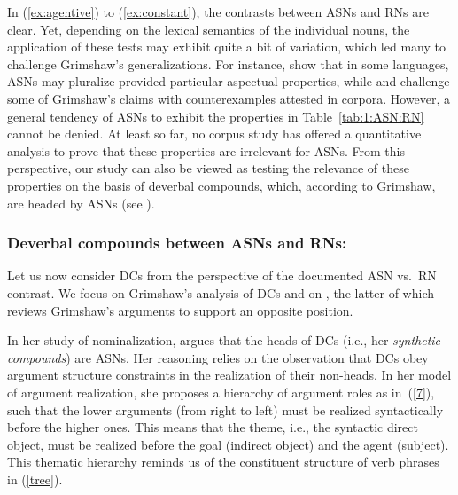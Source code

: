 \documentclass[output=paper]{langsci/langscibook}
\begin{document}
\begin{exe}
\end{exe}

 {In (\ref{ex:agentive}) to (\ref{ex:constant}), the contrasts between ASNs and RNs are clear. Yet, depending on the lexical semantics of the individual nouns, the application of these tests may exhibit quite a bit of variation, which led many to challenge Grimshaw's generalizations. For instance, \cite{alexiadou:iordachioaia:soare:10} show that in some languages, ASNs may pluralize provided particular aspectual properties, while  \cite{grimm:mcnally:13} and \cite{lieber:16} challenge some of Grimshaw's claims with counterexamples attested in corpora. However, a general tendency of ASNs to exhibit the properties in Table~\ref{tab:1:ASN:RN} cannot be denied. At least so far, no corpus study has offered a quantitative analysis to prove that these properties are irrelevant for ASNs. From this perspective, our study can also be viewed as testing the relevance of these properties on the basis of deverbal compounds, which, according to Grimshaw, are headed by ASNs (see ).}


\subsubsection{Deverbal compounds between ASNs and RNs: \cite{grimshaw:90}}\label{sec:prev:lit:DCs}
Let us now consider DCs from the perspective of the documented ASN vs.\ RN contrast. We focus  on Grimshaw's analysis of DCs and on \cite{borer:13}, the latter of which reviews Grimshaw's arguments to support an opposite position.

In her study of nominalization, \cite{grimshaw:90} argues that the heads of DCs (i.e., her \textit{synthetic compounds})  are ASNs.  Her reasoning relies on the observation that DCs obey argument structure constraints in the realization of their non-heads. In her  model of argument realization, she proposes a hierarchy of argument roles as in~(\ref{7}), such that the lower arguments (from right to left) must be realized syntactically before the higher ones.
This means that the theme, i.e., the syntactic direct object, must be realized before the goal (indirect object) and the agent (subject).  {This thematic hierarchy reminds us of the constituent structure of verb phrases in (\ref{tree}).}
\end{document}
